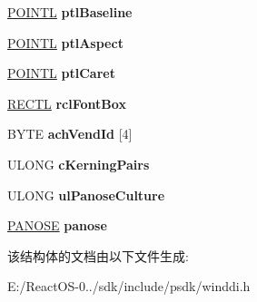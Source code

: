 \begin{DoxyCompactItemize}
\hyperlink{struct___p_o_i_n_t_l}{P\+O\+I\+N\+TL} {\bfseries ptl\+Baseline}
\item 
\mbox{\label{struct___i_f_i_m_e_t_r_i_c_s_a49779f5f0423cce3c72fa1a506dabc60}} 
\hyperlink{struct___p_o_i_n_t_l}{P\+O\+I\+N\+TL} {\bfseries ptl\+Aspect}
\item 
\mbox{\label{struct___i_f_i_m_e_t_r_i_c_s_afc0153ed195336338c16054bbebacac4}} 
\hyperlink{struct___p_o_i_n_t_l}{P\+O\+I\+N\+TL} {\bfseries ptl\+Caret}
\item 
\mbox{\label{struct___i_f_i_m_e_t_r_i_c_s_acdd305c5a9fccd604c5cdef88b9cfb2e}} 
\hyperlink{struct___r_e_c_t_l}{R\+E\+C\+TL} {\bfseries rcl\+Font\+Box}
\item 
\mbox{\label{struct___i_f_i_m_e_t_r_i_c_s_aca8efb03671386b9497b1e5fa93f45ca}} 
B\+Y\+TE {\bfseries ach\+Vend\+Id} \mbox{[}4\mbox{]}
\item 
\mbox{\label{struct___i_f_i_m_e_t_r_i_c_s_af1c189f7973e607d727304d6bd49e602}} 
U\+L\+O\+NG {\bfseries c\+Kerning\+Pairs}
\item 
\mbox{\label{struct___i_f_i_m_e_t_r_i_c_s_a2c3c09f97647a3d04c06c493f2d6063b}} 
U\+L\+O\+NG {\bfseries ul\+Panose\+Culture}
\item 
\mbox{\label{struct___i_f_i_m_e_t_r_i_c_s_ab7f368c666d38bd18e87b42cec3e14eb}} 
\hyperlink{structtag_p_a_n_o_s_e}{P\+A\+N\+O\+SE} {\bfseries panose}
\end{DoxyCompactItemize}


该结构体的文档由以下文件生成\+:\begin{DoxyCompactItemize}
\item 
E\+:/\+React\+O\+S-\/0../sdk/include/psdk/winddi.\+h\end{DoxyCompactItemize}
